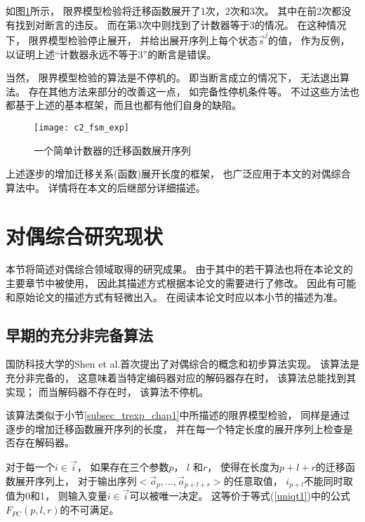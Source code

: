 如图\ref{c2_fsm_exp}所示，
限界模型检验将迁移函数展开了1次，2次和3次。
其中在前2次都没有找到对断言的违反。
而在第3次中则找到了计数器等于3的情况。
在这种情况下，
限界模型检验停止展开，
并给出展开序列上每个状态$\vec{s}^j$的值，
作为反例，
以证明上述“计数器永远不等于3”的断言是错误。

当然，
限界模型检验的算法是不停机的。
即当断言成立的情况下，
无法退出算法。
存在其他方法来部分的改善这一点，
如完备性停机条件等。
不过这些方法也都基于上述的基本框架，而且也都有他们自身的缺陷。

\begin{figure}[t]
  \centering
  \texttt{[image: c2\_fsm\_exp]}
  \caption{一个简单计数器的迁移函数展开序列}
  \label{c2_fsm_exp}
\end{figure}

上述逐步的增加迁移关系(函数)展开长度的框架，
也广泛应用于本文的对偶综合算法中。
详情将在本文的后继部分详细描述。

\section{对偶综合研究现状}\label{sec_now}
本节将简述对偶综合领域取得的研究成果。
由于其中的若干算法也将在本论文的主要章节中被使用，
因此其描述方式根据本论文的需要进行了修改。
因此有可能和原始论文的描述方式有轻微出入。
在阅读本论文时应以本小节的描述为准。

\subsection{早期的充分非完备算法}\label{subsec_sound}

国防科技大学的Shen et al.首次提出了对偶综合的概念和初步算法实现。
该算法是充分非完备的，
这意味着当特定编码器对应的解码器存在时，
该算法总能找到其实现；
而当解码器不存在时，
该算法不停机。

该算法类似于小节\ref{subsec_trexp_chap1}中所描述的限界模型检验，
同样是通过逐步的增加迁移函数展开序列的长度，
并在每一个特定长度的展开序列上检查是否存在解码器。


对于每一个$i\in\vec{i}$，
如果存在三个参数$p$， $l$ 和$r$，
使得在长度为$p+l+r$的迁移函数展开序列上，
对于输出序列$<\vec{o}_p,\dots,\vec{o}_{p+l+r}>$的任意取值，
$i_{p+l}$不能同时取值为0和1，
则输入变量$i\in\vec{i}$可以被唯一决定。
这等价于等式(\ref{uniqt1})中的公式$F_{PC}(p,l,r)$的不可满足。

